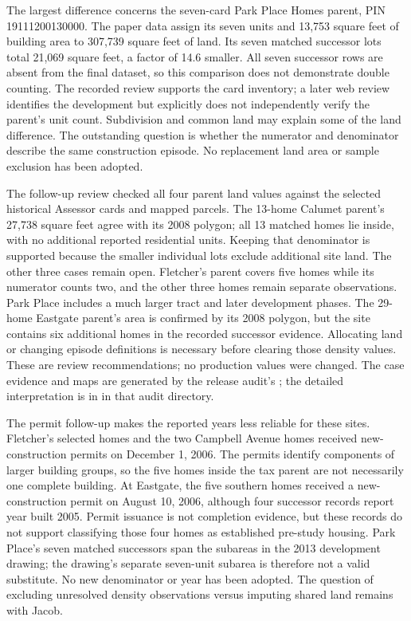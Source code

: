 The largest difference concerns the seven-card Park Place Homes parent,
PIN 19111200130000. The paper data assign its seven units and 13,753 square feet
of building area to 307,739 square feet of land. Its seven matched successor
lots total 21,069 square feet, a factor of 14.6 smaller. All seven successor rows
are absent from the final dataset, so this comparison does not demonstrate
double counting. The recorded review supports the card inventory; a later web
review identifies the development but explicitly does not independently verify
the parent's unit count. Subdivision and common land may explain some of the
land difference. The outstanding question is whether the numerator and
denominator describe the same construction episode. No replacement land area
or sample exclusion has been adopted.

The follow-up review checked all four parent land values against the selected
historical Assessor cards and mapped parcels. The 13-home Calumet parent's
27,738 square feet agree with its 2008 polygon; all 13 matched homes lie inside,
with no additional reported residential units. Keeping that denominator is
supported because the smaller individual lots exclude additional site land.
The other three cases remain open. Fletcher's parent covers five homes while
its numerator counts two, and the other three homes remain separate observations.
Park Place includes a much larger tract and later development phases. The
29-home Eastgate parent's area is confirmed by its 2008 polygon, but the site
contains six additional homes in the recorded successor evidence. Allocating
land or changing episode definitions is necessary before clearing those density
values. These are review recommendations; no production values were changed.
The case evidence and maps are generated by the release audit's
; the detailed interpretation is in
 in that audit directory.

\small
The permit follow-up makes the reported years less reliable for these sites.
Fletcher's selected homes and the two Campbell Avenue homes received new-construction
permits on December 1, 2006. The permits identify components of larger building
groups, so the five homes inside the tax parent are not necessarily one complete
building. At Eastgate, the five southern homes received a new-construction permit
on August 10, 2006, although four successor records report year built 2005.
Permit issuance is not completion evidence, but these records do not support
classifying those four homes as established pre-study housing. Park Place's
seven matched successors span the subareas in the 2013 development drawing;
the drawing's separate seven-unit subarea is therefore not a valid substitute.
No new denominator or year has been adopted. The question of excluding unresolved
density observations versus imputing shared land remains with Jacob.

